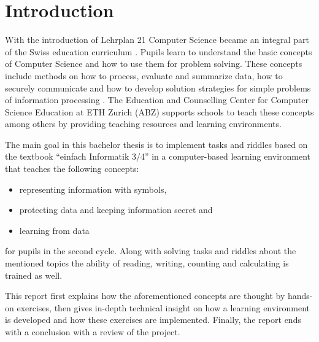 \chapter{Introduction}

With the introduction of Lehrplan 21 Computer Science became an integral part of the Swiss education curriculum \cite{Lehrplan21}. Pupils learn to understand the basic concepts of Computer Science and how to use them for problem solving. These concepts include methods on how to process, evaluate and summarize data, how to securely communicate and how to develop solution strategies for simple problems of information processing \cite{MedienUndInformatik}. The Education and Counselling Center for Computer Science Education at ETH Zurich (ABZ) supports schools to teach these concepts among others by providing teaching resources and learning environments.

The main goal in this bachelor thesis is to implement tasks and riddles based on the textbook “einfach Informatik 3/4” in a computer-based learning environment that teaches the following concepts:
\begin{itemize}
    \item representing information with symbols,
    \item protecting data and keeping information secret and
    \item learning from data
\end{itemize}
for pupils in the second cycle.
Along with solving tasks and riddles about the mentioned topics the ability of reading, writing, counting and calculating is trained as well.

This report first explains how the aforementioned concepts are thought by hands-on exercises, then gives in-depth technical insight on how a learning environment is developed and how these exercises are implemented. Finally, the report ends with a conclusion with a review of the project.
